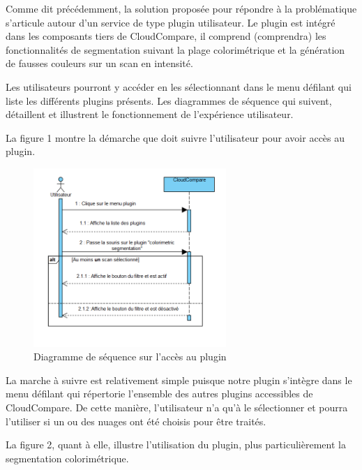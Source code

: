 \documentclass[12pt,titlepage,french]{article}
\begin{document}
Comme dit précédemment, la solution proposée pour répondre à la problématique s'articule autour d'un service de type plugin utilisateur. Le plugin est intégré dans les composants tiers de CloudCompare, il comprend (comprendra) les fonctionnalités de segmentation suivant la plage colorimétrique et la génération de fausses couleurs sur un scan en intensité. \newline

Les utilisateurs pourront y accéder en les sélectionnant dans le menu défilant qui liste les différents plugins présents. Les diagrammes de séquence qui suivent, détaillent et illustrent le fonctionnement de l'expérience utilisateur. \newline

La figure 1 montre la démarche que doit suivre l'utilisateur pour avoir accès au plugin.

\begin{figure}[H]
\center
\includegraphics[width=0.65\textwidth]{./img/sequDiagPlugin.PNG}
    \caption{\label{} Diagramme de séquence sur l'accès au plugin}
\end{figure}

La marche à suivre est relativement simple puisque notre plugin s'intègre dans le menu défilant qui répertorie l'ensemble des autres plugins accessibles de CloudCompare. De cette manière, l'utilisateur n'a qu'à le sélectionner et pourra l'utiliser si un ou des nuages ont été choisis pour être traités. \newline

La figure 2, quant à elle, illustre l'utilisation du plugin, plus particulièrement la segmentation colorimétrique.
\end{document}
